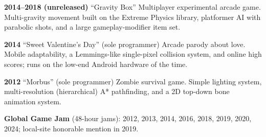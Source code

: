 \documentclass[10.5pt]{article}
\providecommand{\href}[2]{#2}
\begin{document}
\textbf{2014--2018 (unreleased)} \href{https://www.youtube.com/watch?v=HWEEjgTwFdo}{``Gravity Box''} Multiplayer experimental arcade game. Multi-gravity movement built on the Extreme Physics library, platformer AI with parabolic shots, and a large gameplay-modifier item set.

\textbf{2014} ``Sweet Valentine's Day'' (sole programmer) Arcade parody about love. Mobile adaptability, a Lemmings-like single-pixel collision system, and online high scores; runs on the low-end Android hardware of the time.

\textbf{2012} ``Morbus'' (sole programmer) Zombie survival game. Simple lighting system, multi-resolution (hierarchical) A* pathfinding, and a 2D top-down bone animation system.

\textbf{Global Game Jam} (48-hour jams): 2012, 2013, 2014, 2016, 2018, 2019, 2020, 2024; \href{https://axolotlbros.itch.io/home-steal-rhythm-home}{local-site honorable mention in 2019}.
\end{document}

